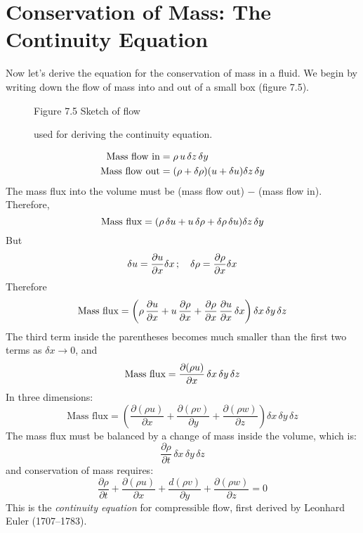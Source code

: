 \section{Conservation of Mass: The Continuity Equation}
Now let's
derive the equation for the conservation of mass in a fluid. We begin
by writing down the flow of mass into and out of a small box (figure
7.5).
\begin{figure}[h!]
\centering
\footnotesize
Figure 7.5 Sketch of flow \rule{0mm}{4ex}used for deriving the
continuity equation.
\label{fig:continuitysketchR}
\vspace{-3ex}
\end{figure}
\begin{align}
\text{Mass flow in} &= \rho \, u \, \delta z \, \delta y \notag  \\
\text{Mass flow out} &= (\rho + \delta \rho ) (u + \delta u) \delta z \,  \delta y \notag
\end{align}
The mass flux into the volume must be (mass flow out) $-$ (mass flow
in). Therefore,
\begin{equation}
\text{Mass flux} = ( \rho \, \delta u + u \, \delta \rho + \delta \rho \, \delta u)  \delta z \,  \delta y \notag
\end{equation}
But
\begin{equation}
\delta u = \frac{\partial u}{\partial x} \delta x \,;\quad \delta \rho = \frac{\partial {\rho}}{\partial x} \delta x \notag
\end{equation}
Therefore
\begin{equation}
\text{Mass flux} = \left(\rho \, \frac{\partial{u}}{\partial{x}} + u\,\frac{\partial{\rho}}{\partial{x}}
+\frac{\partial{\rho}}{\partial{x}}\,\frac{\partial{u}}{\partial{x}}\,\delta{x}\right)\delta{x}\,\delta{y}\,\delta{z}
\notag
\end{equation}
The third term inside the parentheses becomes much smaller than the
first two terms as $\delta x \rightarrow 0$, and
\begin{equation}
\text{Mass flux} =
\frac{\partial{(\rho{u})}}{\partial{x}}\,\delta{x}\,\delta{y}\,\delta{z} \notag
\end{equation}
In three dimensions:
\begin{displaymath}
\mbox{Mass flux} = \left(\frac{\partial{(\rho{u})}}{\partial{x}} +
\frac{\partial{(\rho{v})}}{\partial{y}} +
\frac{\partial{(\rho{w})}}{\partial{z}}\right)\delta{x}\,\delta{y}\,\delta{z}
\end{displaymath}
The mass flux must be balanced by a change of mass inside the volume,
which is:
\begin{displaymath}
\frac{\partial\rho}{\partial{t}}\,\delta{x}\,\delta{y}\,\delta{z}
\end{displaymath}
and conservation of mass requires:
\begin{equation}
\frac{\partial\rho}{\partial{t}} + \frac{\partial{(\rho{u})}}{\partial{x}} + \frac{d(\rho{v})}{\partial{y}} + \frac{\partial{(\rho{w})}}{\partial{z}} = 0
\end{equation}
This is the \textit{continuity equation} for compressible flow, first derived by Leonhard
Euler (1707--1783).


